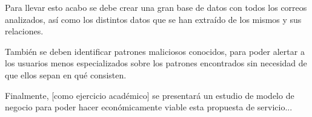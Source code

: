 Para llevar esto acabo se debe crear una gran base de datos con todos los correos analizados, así como los distintos datos que se han extraído de los mismos y sus relaciones. 

También se deben identificar patrones maliciosos conocidos, para poder alertar a los usuarios menos especializados sobre los patrones encontrados sin necesidad de que ellos sepan en qué consisten.


 Finalmente, [como ejercicio académico] se presentará un estudio de modelo de negocio para poder hacer económicamente viable esta propuesta de servicio...